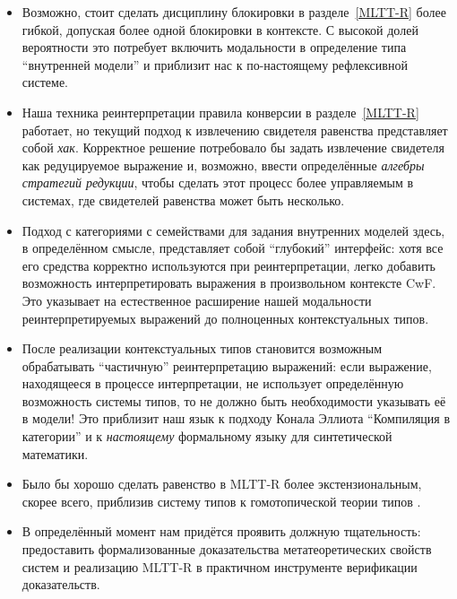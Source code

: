 \begin{itemize}
    \item Возможно, стоит сделать дисциплину блокировки
        в разделе~\ref{MLTT-R} более гибкой, допуская
        более одной блокировки в контексте. С высокой
        долей вероятности это потребует включить
        модальности в определение типа ``внутренней
        модели'' и приблизит нас к по-настоящему
        рефлексивной системе.
    \item Наша техника реинтерпретации правила
        конверсии в разделе~\ref{MLTT-R} работает, но
        текущий подход к извлечению свидетеля равенства
        представляет собой \textit{хак}. Корректное
        решение потребовало бы задать извлечение
        свидетеля как редуцируемое выражение и,
        возможно, ввести определённые \textit{алгебры
        стратегий редукции}, чтобы сделать этот процесс
        более управляемым в системах, где свидетелей
        равенства может быть несколько.
    \item Подход с категориями с семействами для
        задания внутренних моделей здесь, в
        определённом смысле, представляет собой
        ``глубокий'' интерфейс: хотя все его средства
        корректно используются при реинтерпретации,
        легко добавить возможность интерпретировать
        выражения в произвольном контексте CwF. Это
        указывает на естественное расширение нашей
        модальности реинтерпретируемых выражений до
        полноценных контекстуальных типов.
    \item После реализации контекстуальных типов
        становится возможным обрабатывать ``частичную''
        реинтерпретацию выражений: если выражение,
        находящееся в процессе интерпретации, не
        использует определённую возможность системы
        типов, то не должно быть необходимости
        указывать её в модели! Это приблизит наш язык к
        подходу Конала Эллиота ``Компиляция в
        категории'' \cite{Elliott:Compcat2017} и к
        \textit{настоящему} формальному языку для
        синтетической математики.
    \item Было бы хорошо сделать равенство в MLTT-R
        более экстензиональным, скорее всего,
        приблизив систему типов к гомотопической теории
        типов \cite{hottbook}.
    \item В определённый момент нам придётся проявить
        должную тщательность: предоставить
        формализованные доказательства
        метатеоретических свойств систем и реализацию
        MLTT-R в практичном инструменте верификации
        доказательств.
\end{itemize}
